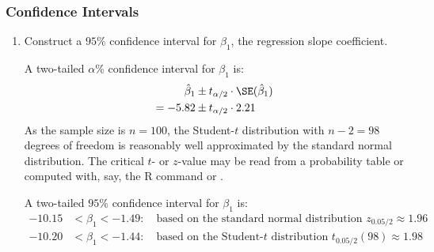 \begin{frame}
\frametitle{Confidence Intervals}
\ask
\begin{enumerate}\setcounter{enumi}{0}

\item Construct a $95\%$ confidence interval for $\beta_1$, the regression slope coefficient.

\begin{answer}
A two-tailed $\alpha\%$ confidence interval for $\beta_{1}$ is:
\begin{align*}
\hat{\beta}_{1} & \pm t_{\alpha/2} \cdot \SE(\hat{\beta}_{1}) \\
       = - 5.82 & \pm t_{\alpha/2} \cdot 2.21
\end{align*}
As the sample size is $n=100$, the Student-$t$ distribution with $n-2=98$ degrees of freedom is reasonably well approximated by the standard normal distribution. 
The critical $t$- or $z$-value may be read from a probability table or computed with, say, the R command  or .

A two-tailed $95\%$ confidence interval for $\beta_{1}$ is:
\begin{align*}
-10.15 & < \beta_{1} < -1.49
:\quad\text{based on the standard normal distribution $z_{0.05/2}\approx1.96$}\\
-10.20 & < \beta_{1} < -1.44
:\quad\text{based on the Student-$t$ distribution $t_{0.05/2}(98)\approx1.98$}
\end{align*}
\end{answer}

\end{enumerate}
\end{frame}


